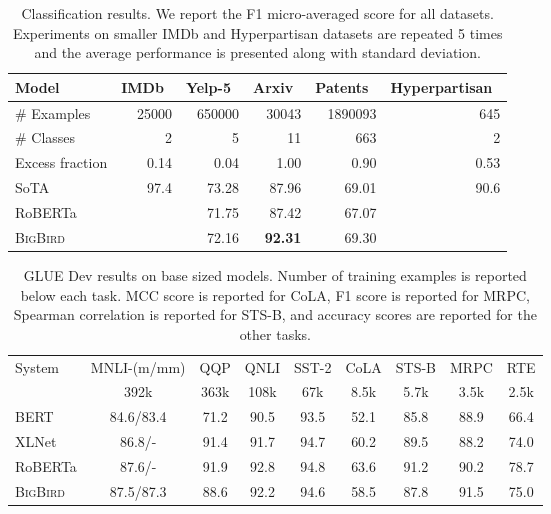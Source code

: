 \documentclass{article}
\newcommand{\bigb}{\textsc{BigBird}\xspace}
\begin{document}
\begin{table}
    \centering
    \small
    \begin{tabular}{@{}lrrrrr@{}}
    \toprule
    Model & IMDb~\citep{maas2011learning} & Yelp-5~\citep{zhang2015character} & Arxiv~\citep{he2019long}  & Patents~\citep{lee2020patent} & Hyperpartisan~\citep{kiesel2019semeval}\\
    \midrule
    \# Examples & 25000 & 650000 & 30043 & 1890093 & 645 \\
    \# Classes & 2 & 5 & 11 & 663 & 2 \\
    Excess fraction & 0.14 & 0.04 & 1.00 & 0.90 & 0.53 \\
    \midrule
    SoTA & \citep{thongtan2019sentiment} 97.4 & \citep{abreu2019hierarchical} 73.28 & \citep{olson2019adapting} 87.96 &  \citep{olson2019adapting} 69.01 &
    \citep{jiang2019team} 90.6 \\
    RoBERTa &  & 71.75 & 87.42 &  67.07 &  \\
    \bigb  &  & 72.16 & \textbf{92.31} & 69.30 &  \\
     \bottomrule
    \end{tabular}
    \vspace{2mm}
        \caption{Classification results. We report the F1 micro-averaged score for all datasets. Experiments on smaller IMDb and Hyperpartisan datasets are repeated 5 times and the average performance is presented along with standard deviation.}
    \label{tab:cls}
\end{table}

\begin{table}[bht]
\small
\centering
 \begin{tabular}{@{}lcccccccc@{}}
    \toprule
System             &  MNLI-(m/mm) & QQP  & QNLI & SST-2 & CoLA & STS-B & MRPC & RTE  \\
                   & 392k         & 363k & 108k & 67k   & 8.5k & 5.7k  & 3.5k & 2.5k   \\ 
\midrule
BERT               & 84.6/83.4    & 71.2 & 90.5 & 93.5  & 52.1 & 85.8  & 88.9 & 66.4 \\
XLNet              & 86.8/-       & 91.4 & 91.7 & 94.7  & 60.2 & 89.5  & 88.2 & 74.0 \\
RoBERTa            & 87.6/-       & 91.9 & 92.8 & 94.8  & 63.6 & 91.2  & 90.2 & 78.7 \\
\bigb     & 87.5/87.3    & 88.6 & 92.2 & 94.6  & 58.5 & 87.8  & 91.5 & 75.0 \\
    \bottomrule
   \end{tabular}
   \vspace{2mm}
      \caption{GLUE Dev results on base sized models. 
   Number of training examples is reported below each task.
   MCC score is reported for CoLA, F1 score is reported for MRPC, Spearman correlation is reported for STS-B, and accuracy scores are reported for the other tasks.}
   \label{tab:glue_dev}
\end{table}
\end{document}
